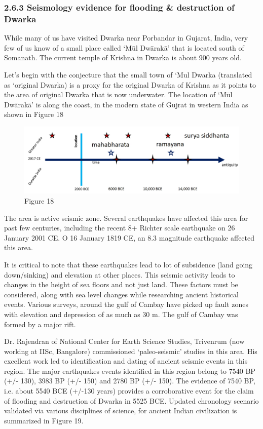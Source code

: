 \subsubsection{2.6.3 Seismology evidence for flooding \& destruction of Dwarka}

While many of us have visited Dwarka near Porbandar in Gujarat, India, very few of us know of a small place called ‘Mūl Dwārakā’ that is located south of Somanath. The current temple of Krishna in Dwarka is about 900 years old.

Let’s begin with the conjecture that the small town of ‘Mul Dwarka (translated as ‘original Dwarka) is a proxy for the original Dwarka of Krishna as it points to the area of original Dwarka that is now underwater. The location of ‘Mūl Dwārakā’ is along the coast, in the modern state of Gujrat in western India as shown in Figure 18

\begin{figure}
\includegraphics{"images/8-18.jpg"}
\caption{Figure 18}
\end{figure}

The area is active seismic zone. Several earthquakes have affected this area for past few centuries, including the recent 8+ Richter scale earthquake on 26 January 2001 CE. O 16 January 1819 CE, an 8.3 magnitude earthquake affected this area.

It is critical to note that these earthquakes lead to lot of subsidence (land going down/sinking) and elevation at other places. This seismic activity leads to changes in the height of sea floors and not just land. These factors must be considered, along with sea level changes while researching ancient historical events. Various surveys, around the gulf of Cambay have picked up fault zones with elevation and depression of as much as 30 m. The gulf of Cambay was formed by a major rift.

Dr. Rajendran of National Center for Earth Science Studies, Trivenrum (now working at IISc, Bangalore) commissioned ‘paleo-seismic’ studies in this area. His excellent work led to identification and dating of ancient seismic events in this region. The major earthquakes events identified in this region belong to 7540 BP (+/- 130), 3983 BP (+/- 150) and 2780 BP (+/- 150). The evidence of 7540 BP, i.e. about 5540 BCE (+/-130 years) provides a corroborative event for the claim of flooding and destruction of Dwarka in 5525 BCE. Updated chronology scenario validated via various disciplines of science, for ancient Indian civilization is summarized in Figure 19.

